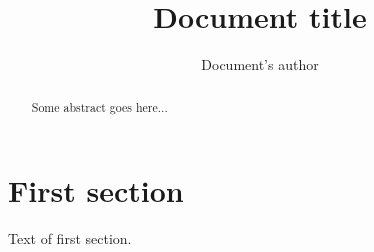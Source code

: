 \documentclass[a4paper,10pt]{article}
\title{Document title}
\author{Document's author}
\begin{document}
\maketitle

\begin{abstract}
Some abstract goes here...
\end{abstract}

\section{First section}

Text of first section.





\end{document}
